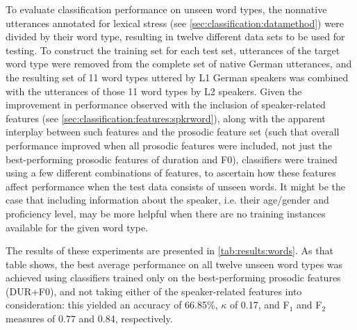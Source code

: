 	
	To evaluate classification performance on unseen word types, the nonnative utterances annotated for lexical stress (see \cref{sec:classification:datamethod}) were divided by their word type, resulting in twelve different data sets to be used for testing. To construct the training set for each test set, utterances of the target word type  were removed from the complete set of native German utterances, and the resulting set of 11 word types uttered by L1 German speakers was combined with the utterances of those 11 word types by L2 speakers. Given the improvement in performance observed with the inclusion of speaker-related features (see \cref{sec:classification:features:spkrword}), along with the apparent interplay between such features and the prosodic feature set (such that overall performance improved when all prosodic features were included, not just the best-performing prosodic features of duration and F0), classifiers were trained using a few  different combinations of features, to ascertain how these features affect performance when the test data consists of unseen words. It might be the case that including information about the speaker, i.e. their age/gender and proficiency level, may be more helpful when there are no training instances available for the given word type. 
	
	The results of these experiments are presented in \cref{tab:results:words}. As that table shows, the best average performance on all twelve unseen word types was achieved using classifiers trained only on the best-performing prosodic features (DUR+F0), and not taking either of the speaker-related features into consideration: this yielded an accuracy of 66.85\%, $\kappa$ of 0.17, and F$_1$ and F$_2$ measures of 0.77 and 0.84, respectively. 
	
